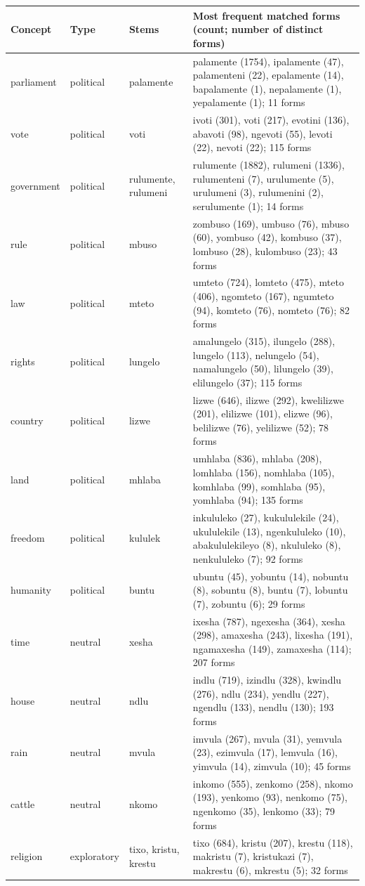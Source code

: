 \documentclass[10pt,letterpaper]{article}
\begin{document}
\begin{tabular}{@{}p{1.9cm}p{1.6cm}p{2.0cm}p{9.6cm}@{}}
\toprule
Concept & Type & Stems & Most frequent matched forms (count; number of distinct forms) \\ \midrule
parliament & political & palamente & palamente (1754), ipalamente (47), palamenteni (22), epalamente (14), bapalamente (1), nepalamente (1), yepalamente (1); 11 forms \\
vote & political & voti & ivoti (301), voti (217), evotini (136), abavoti (98), ngevoti (55), levoti (22), nevoti (22); 115 forms \\
government & political & rulumente, rulumeni & rulumente (1882), rulumeni (1336), rulumenteni (7), urulumente (5), urulumeni (3), rulumenini (2), serulumente (1); 14 forms \\
rule & political & mbuso & zombuso (169), umbuso (76), mbuso (60), yombuso (42), kombuso (37), lombuso (28), kulombuso (23); 43 forms \\
law & political & mteto & umteto (724), lomteto (475), mteto (406), ngomteto (167), ngumteto (94), komteto (76), nomteto (76); 82 forms \\
rights & political & lungelo & amalungelo (315), ilungelo (288), lungelo (113), nelungelo (54), namalungelo (50), lilungelo (39), elilungelo (37); 115 forms \\
country & political & lizwe & lizwe (646), ilizwe (292), kwelilizwe (201), elilizwe (101), elizwe (96), belilizwe (76), yelilizwe (52); 78 forms \\
land & political & mhlaba & umhlaba (836), mhlaba (208), lomhlaba (156), nomhlaba (105), komhlaba (99), somhlaba (95), yomhlaba (94); 135 forms \\
freedom & political & kululek & inkululeko (27), kukululekile (24), ukululekile (13), ngenkululeko (10), abakululekileyo (8), nkululeko (8), nenkululeko (7); 92 forms \\
humanity & political & buntu & ubuntu (45), yobuntu (14), nobuntu (8), sobuntu (8), buntu (7), lobuntu (7), zobuntu (6); 29 forms \\
time & neutral & xesha & ixesha (787), ngexesha (364), xesha (298), amaxesha (243), lixesha (191), ngamaxesha (149), zamaxesha (114); 207 forms \\
house & neutral & ndlu & indlu (719), izindlu (328), kwindlu (276), ndlu (234), yendlu (227), ngendlu (133), nendlu (130); 193 forms \\
rain & neutral & mvula & imvula (267), mvula (31), yemvula (23), ezimvula (17), lemvula (16), yimvula (14), zimvula (10); 45 forms \\
cattle & neutral & nkomo & inkomo (555), zenkomo (258), nkomo (193), yenkomo (93), nenkomo (75), ngenkomo (35), lenkomo (33); 79 forms \\
religion & exploratory & tixo, kristu, krestu & tixo (684), kristu (207), krestu (118), makristu (7), kristukazi (7), makrestu (6), mkrestu (5); 32 forms \\
\bottomrule
\end{tabular}
\end{document}
